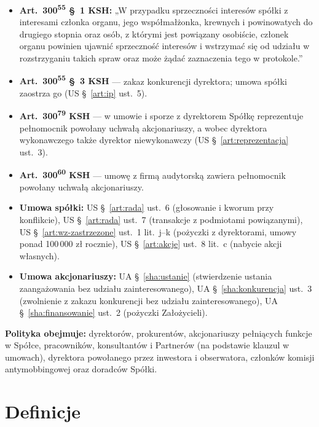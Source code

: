 \documentclass[11pt,a4paper]{report}
\newcommand{\US}[1]{US §~#1}
\newcommand{\UA}[1]{UA §~#1}
\begin{document}
\begin{Prawo}
\begin{itemize}
  \item \textbf{Art.~300\textsuperscript{55} §~1 KSH:} „W przypadku sprzeczności interesów spółki z interesami członka organu, jego współmałżonka, krewnych i powinowatych do drugiego stopnia oraz osób, z którymi jest powiązany osobiście, członek organu powinien ujawnić sprzeczność interesów i wstrzymać się od udziału w rozstrzyganiu takich spraw oraz może żądać zaznaczenia tego w protokole.”
  \item \textbf{Art.~300\textsuperscript{55} §~3 KSH} --- zakaz konkurencji dyrektora; umowa spółki zaostrza go (\US{\ref{art:ip} ust.~5}).
  \item \textbf{Art.~300\textsuperscript{79} KSH} --- w umowie i sporze z dyrektorem Spółkę reprezentuje pełnomocnik powołany uchwałą akcjonariuszy, a wobec dyrektora wykonawczego także dyrektor niewykonawczy (\US{\ref{art:reprezentacja} ust.~3}).
  \item \textbf{Art.~300\textsuperscript{60} KSH} --- umowę z firmą audytorską zawiera pełnomocnik powołany uchwałą akcjonariuszy.
  \item \textbf{Umowa spółki:} \US{\ref{art:rada} ust.~6} (głosowanie i kworum przy konflikcie), \US{\ref{art:rada} ust.~7} (transakcje z podmiotami powiązanymi), \US{\ref{art:wz-zastrzezone} ust.~1 lit.~j--k} (pożyczki z dyrektorami, umowy ponad 100\,000 zł rocznie), \US{\ref{art:akcje} ust.~8 lit.~c} (nabycie akcji własnych).
  \item \textbf{Umowa akcjonariuszy:} \UA{\ref{sha:ustanie}} (stwierdzenie ustania zaangażowania bez udziału zainteresowanego), \UA{\ref{sha:konkurencja} ust.~3} (zwolnienie z zakazu konkurencji bez udziału zainteresowanego), \UA{\ref{sha:finansowanie} ust.~2} (pożyczki Założycieli).
\end{itemize}
\end{Prawo}

\textbf{Polityka obejmuje:} dyrektorów, prokurentów, akcjonariuszy pełniących funkcje w Spółce, pracowników, konsultantów i Partnerów (na podstawie klauzul w umowach), dyrektora powołanego przez inwestora i obserwatora, członków komisji antymobbingowej oraz doradców Spółki.

\section{Definicje}
\end{document}
